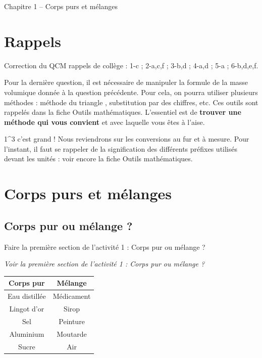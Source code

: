 \documentclass[12pt,a4paper]{article}
\begin{document}
\begin{header}
Chapitre 1 -- Corps purs et mélanges
\end{header}

\section{Rappels}

Correction du QCM rappels de collège : 1-c ; 2-a,c,f ; 3-b,d ; 4-a,d ; 5-a ; 6-b,d,e,f.

\begin{conseil}
Pour la dernière question, il est nécessaire de manipuler la formule de la masse volumique donnée à la question précédente.
Pour cela, on pourra utiliser plusieurs méthodes : méthode du \og triangle \fg{}, substitution par des chiffres, etc.
Ces outils sont rappelés dans la fiche \og Outils mathématiques\fg{}.
L'essentiel est de \textbf{trouver une méthode qui vous convient} et avec laquelle vous êtes à l'aise.
\end{conseil}

\begin{remarque}
\unit{1}{\meter^3} c'est grand !
Nous reviendrons sur les conversions au fur et à mesure.
Pour l'instant, il faut se rappeler de la signification des différents préfixes utilisés devant les unités : voir encore la fiche \og Outils mathématiques\fg{}.
\end{remarque}


\section{Corps purs et mélanges}
\label{sec:corps_purs_melanges}

\subsection{Corps pur ou mélange ?}

\begin{conseil}
Faire la première section de l'activité 1 : Corps pur ou mélange ?
\end{conseil}

\begin{exemple}
\emph{Voir la première section de l'activité 1 : Corps pur ou mélange ?}
\center
\begin{tabular}{c|c}
\textbf{Corps pur} & \textbf{Mélange} \\
\hline
Eau distillée & Médicament \\
Lingot d'or   & Sirop \\
Sel           & Peinture \\
Aluminium     & Moutarde \\
Sucre         & Air
\end{tabular}
\end{exemple}
\end{document}
